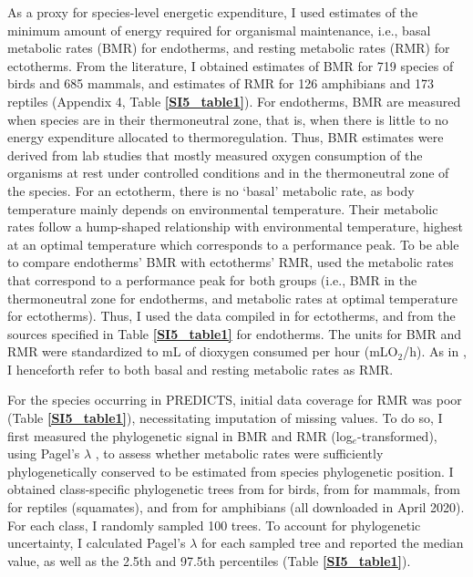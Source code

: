 As a proxy for species-level energetic expenditure, I used estimates of the minimum amount of energy required for organismal maintenance, i.e., basal metabolic rates (BMR) for endotherms, and resting metabolic rates (RMR) for ectotherms. From the literature, I obtained estimates of BMR for 719 species of birds and 685 mammals, and estimates of RMR for 126 amphibians and 173 reptiles (Appendix 4, Table \textbf{\ref{SI5_table1}}). For endotherms, BMR are measured when species are in their thermoneutral zone, that is, when there is little to no energy expenditure allocated to thermoregulation. Thus, BMR estimates were derived from lab studies that mostly measured oxygen consumption of the organisms at rest under controlled conditions and in the thermoneutral zone of the species. For an ectotherm, there is no `basal' metabolic rate, as body temperature mainly depends on environmental temperature. Their metabolic rates follow a hump-shaped relationship with environmental temperature, highest at an optimal temperature which corresponds to a performance peak. To be able to compare endotherms’ BMR with ectotherms’ RMR, \citet{Stark2020} used the metabolic rates that correspond to a performance peak for both groups (i.e., BMR in the thermoneutral zone for endotherms, and metabolic rates at optimal temperature for ectotherms). Thus, I used the data compiled in \citet{Stark2020} for ectotherms, and from the sources specified in Table \textbf{\ref{SI5_table1}} for endotherms. The units for BMR and RMR were standardized to mL of dioxygen consumed per hour (mLO$_2$/h). As in \citet{Stark2020}, I henceforth refer to both basal and resting metabolic rates as RMR. 

For the species occurring in PREDICTS, initial data coverage for RMR was poor (Table \textbf{\ref{SI5_table1}}), necessitating imputation of missing values. To do so, I first measured the phylogenetic signal in BMR and RMR (log$_e$-transformed), using Pagel’s $\lambda$ \citep{Pagel1999}, to assess whether metabolic rates were sufficiently phylogenetically conserved to be estimated from species phylogenetic position. I obtained class-specific phylogenetic trees from \citet{Jetz2012} for birds, from \citet{Faurby2018, Faurby2020} for mammals, from \citep{Tonini2016} for reptiles (squamates), and from \citet{Jetz2018} for amphibians (all downloaded in April 2020). For each class, I randomly sampled 100 trees. To account for phylogenetic uncertainty, I calculated Pagel’s $\lambda$ for each sampled tree and reported the median value, as well as the 2.5th and 97.5th percentiles (Table \textbf{\ref{SI5_table1}}).  


